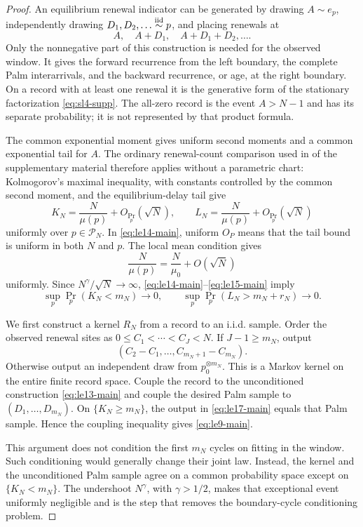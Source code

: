 \begin{proof}
An equilibrium renewal indicator can be generated by drawing
\(A\sim e_p\), independently drawing \(D_1,D_2,\ldots\stackrel{\rm iid}{\sim}p\),
and placing renewals at
\[
 A,\quad A+D_1,\quad A+D_1+D_2,\ldots .
\tag{LE13}\label{eq:le13-main}
\]
Only the nonnegative part of this construction is needed for the observed
window.  It gives the forward recurrence from the left boundary, the
complete Palm interarrivals, and the backward recurrence, or age, at the
right boundary.  On a record with at least one renewal it is the generative
form of the stationary factorization \eqref{eq:sl4-supp}.  The all-zero record is
the event \(A>N-1\) and has its separate probability; it is not represented
by that product formula.

The common exponential moment gives uniform second moments and a common
exponential tail for \(A\).  The ordinary renewal-count comparison used in
 of the supplementary material therefore applies without a
parametric chart: Kolmogorov's maximal inequality, with constants controlled
by the common second moment, and the equilibrium-delay tail give
\[
 K_N=\frac N{\mu(p)}+O_{\Pr_p}(\sqrt N),
 \qquad
 L_N=\frac N{\mu(p)}+O_{\Pr_p}(\sqrt N)
\tag{LE14}\label{eq:le14-main}
\]
uniformly over \(p\in\mathcal P_N\).  In \eqref{eq:le14-main}, uniform
\(O_P\) means that the tail bound is uniform in both \(N\) and \(p\).
The local mean condition gives
\[
 \frac N{\mu(p)}=\frac N{\mu_0}+O(\sqrt N)
\tag{LE15}\label{eq:le15-main}
\]
uniformly.  Since \(N^\gamma/\sqrt N\to\infty\),
\eqref{eq:le14-main}--\eqref{eq:le15-main} imply
\[
 \sup_p\Pr_p(K_N<m_N)\to0,
 \qquad
 \sup_p\Pr_p(L_N>m_N+r_N)\to0.
\tag{LE16}\label{eq:le16-main}
\]

We first construct a kernel \(R_N\) from a record to an i.i.d. sample.
Order the observed renewal sites as
\(0\le C_1<\cdots<C_J<N\).  If \(J-1\ge m_N\), output
\[
 (C_2-C_1,\ldots,C_{m_N+1}-C_{m_N}).
\tag{LE17}\label{eq:le17-main}
\]
Otherwise output an independent draw from \(p_0^{\otimes m_N}\).  This is a
Markov kernel on the entire finite record space.  Couple the record to the
unconditioned construction \eqref{eq:le13-main} and couple the desired Palm
sample to \((D_1,\ldots,D_{m_N})\).  On \(\{K_N\ge m_N\}\), the output in
\eqref{eq:le17-main} equals that Palm sample.  Hence the coupling inequality gives
\eqref{eq:le9-main}.

This argument does not condition the first \(m_N\) cycles on fitting in the
window.  Such conditioning would generally change their joint law.  Instead,
the kernel and the unconditioned Palm sample agree on a common probability
space except on \(\{K_N<m_N\}\).  The undershoot \(N^\gamma\), with
\(\gamma>1/2\), makes that exceptional event uniformly negligible and is the
step that removes the boundary-cycle conditioning problem.


\end{proof}
